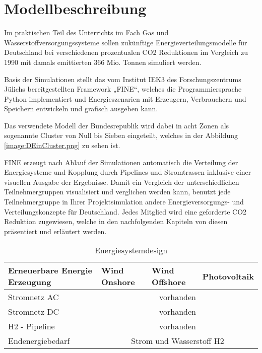 \section{Modellbeschreibung}


\newpage
{}
Im praktischen Teil des Unterrichts im Fach Gas und Wasserstoffversorgungssysteme sollen zukünftige Energieverteilungsmodelle für Deutschland bei verschiedenen prozentualen CO2 Reduktionen im Vergleich zu 1990 mit damals emittierten 366 Mio. Tonnen simuliert werden. 

Basis der Simulationen stellt das vom Institut IEK3 des Forschungszentrums Jülichs bereitgestellten Framework „FINE“, welches die Programmiersprache Python implementiert und Energieszenarien mit Erzeugern, Verbrauchern und Speichern entwickeln und grafisch ausgeben kann.

Das verwendete Modell der Bundesrepublik wird dabei in acht Zonen als sogenannte Cluster von Null bis Sieben eingeteilt, welches in der Abbildung \ref{image:DEinCluster.png} zu sehen ist.


FINE erzeugt nach Ablauf der Simulationen automatisch die Verteilung der Energiesysteme und Kopplung durch Pipelines und Stromtrassen inklusive einer visuellen Ausgabe der Ergebnisse.
Damit ein Vergleich der unterschiedlichen Teilnehmergruppen visualisiert und verglichen werden kann, benutzt jede Teilnehmergruppe in Ihrer Projektsimulation andere Energieversorgungs- und Verteilungskonzepte für Deutschland. Jedes Mitglied wird eine geforderte CO2 Reduktion zugewiesen, welche in den nachfolgenden Kapiteln von diesen präsentiert und erläutert werden.%


\begin{table}[ht!]
    \begin{tabular}{|lcll|}
        \hline
        \multicolumn{1}{|l|}{Erneuerbare Energie Erzeugung} & \multicolumn{1}{l|}{Wind Onshore} & \multicolumn{1}{l|}{Wind Offshore} & Photovoltaik \\ \hline
        \multicolumn{1}{|l|}{Stromnetz AC}     & \multicolumn{3}{c|}{vorhanden}                \\ \hline
        \multicolumn{1}{|l|}{Stromnetz DC}     & \multicolumn{3}{c|}{vorhanden}                \\ \hline
        \multicolumn{1}{|l|}{H2 - Pipeline}    & \multicolumn{3}{c|}{vorhanden}                \\ \hline
        \multicolumn{1}{|l|}{Endenergiebedarf} & \multicolumn{3}{c|}{Strom und Wasserstoff H2} \\ \hline
    \end{tabular}
    \caption{Energiesystemdesign}
    \label{tab:systemdesign}
\end{table}



